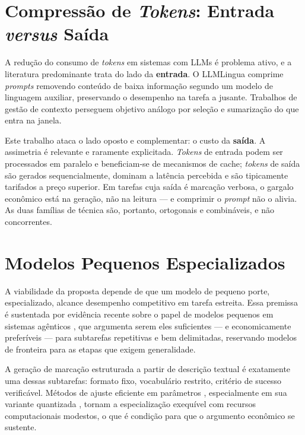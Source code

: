 \section{Compressão de \textit{Tokens}: Entrada \textit{versus} Saída}
\label{sec:tr-compressao}

A redução do consumo de \textit{tokens} em sistemas com LLMs é problema ativo, e a literatura predominante trata do lado da \textbf{entrada}. O LLMLingua \cite{jiang2023llmlingua} comprime \textit{prompts} removendo conteúdo de baixa informação segundo um modelo de linguagem auxiliar, preservando o desempenho na tarefa a jusante. Trabalhos de gestão de contexto perseguem objetivo análogo por seleção e sumarização do que entra na janela.

Este trabalho ataca o lado oposto e complementar: o custo da \textbf{saída}. A assimetria é relevante e raramente explicitada. \textit{Tokens} de entrada podem ser processados em paralelo e beneficiam-se de mecanismos de cache; \textit{tokens} de saída são gerados sequencialmente, dominam a latência percebida e são tipicamente tarifados a preço superior. Em tarefas cuja saída é marcação verbosa, o gargalo econômico está na geração, não na leitura — e comprimir o \textit{prompt} não o alivia. As duas famílias de técnica são, portanto, ortogonais e combináveis, e não concorrentes.

\section{Modelos Pequenos Especializados}
\label{sec:tr-slm}

A viabilidade da proposta depende de que um modelo de pequeno porte, especializado, alcance desempenho competitivo em tarefa estreita. Essa premissa é sustentada por evidência recente sobre o papel de modelos pequenos em sistemas agênticos \cite{belcak2025small}, que argumenta serem eles suficientes — e economicamente preferíveis — para subtarefas repetitivas e bem delimitadas, reservando modelos de fronteira para as etapas que exigem generalidade.

A geração de marcação estruturada a partir de descrição textual é exatamente uma dessas subtarefas: formato fixo, vocabulário restrito, critério de sucesso verificável. Métodos de ajuste eficiente em parâmetros \cite{hu2022lora}, especialmente em sua variante quantizada \cite{dettmers2023qlora}, tornam a especialização exequível com recursos computacionais modestos, o que é condição para que o argumento econômico se sustente.


